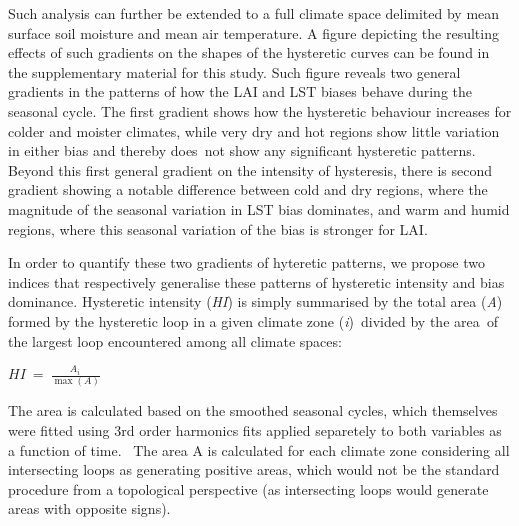 \documentclass[gmd, manuscript]{copernicus}
\begin{document}
{%
%

Such analysis can further be extended to a full climate space delimited by mean surface soil moisture and mean air temperature. A figure depicting the resulting effects of such gradients on the shapes of the hysteretic curves can be found in the supplementary material for this study. Such figure reveals two general gradients in the
patterns of how the LAI and LST biases behave during the seasonal cycle.
The first gradient shows how the hysteretic behaviour increases for
colder and moister climates, while very dry and hot regions show little
variation in either bias and thereby does~not show any significant
hysteretic patterns. Beyond this first general gradient on the
intensity of hysteresis, there is second gradient showing a notable
difference between cold and dry regions, where the magnitude of the
seasonal variation in LST bias dominates, and warm and humid regions,
where this seasonal variation of the bias is stronger for LAI. 

In order to quantify these two gradients of hyteretic patterns, we propose two indices that respectively generalise these patterns of hysteretic intensity and bias
dominance. {{Hysteretic intensity (}}\emph{{HI}}{)} is simply summarised
by the total area (\emph{A}) formed by the hysteretic loop in a given
climate zone (\emph{i})\emph{~}divided by the area\emph{~}of the largest
loop encountered among all climate spaces:

\(HI\ =\ \frac{A_{i\ }}{\max\left(A\right)}\)

The area is calculated based on the smoothed seasonal cycles, which
themselves were fitted using {3rd order harmonics fits applied
separetely to both variables as a function of time}.~ The area A is
calculated for each climate zone considering all intersecting loops as
generating positive areas, which would not be the standard procedure
from a topological perspective (as intersecting loops would generate
areas with opposite signs).

}
\end{document}
